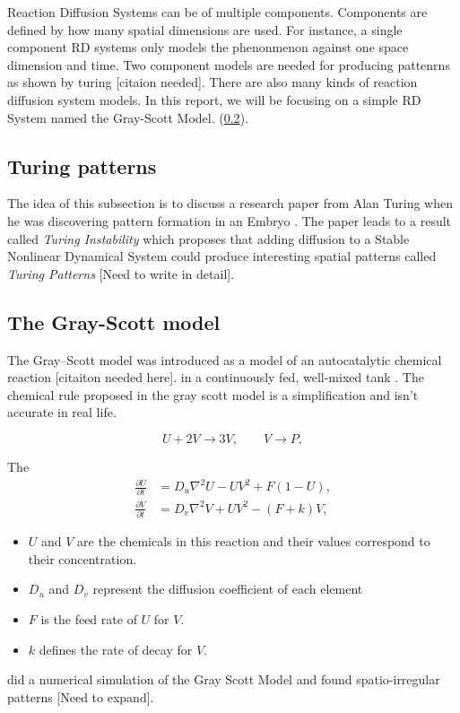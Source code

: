 Reaction Diffusion Systems can be of multiple components. Components are defined by how many spatial dimensions are used. For instance, a single component RD systems only models the phenonmenon against one space dimension and time. Two component models are needed for producing pattenrns as shown by turing [citaion needed]. There are also many kinds of reaction diffusion system models. In this report, we will be focusing on a simple RD System named the Gray-Scott Model. (\cref{sec:gray-scott}).

\subsection{Turing patterns}
\label{sec:turing-patterns}

The idea of this subsection is to discuss a research paper from Alan Turing when he was discovering pattern formation in an Embryo \cite{turing1952}. The paper leads to a result called \emph{Turing Instability} which proposes that adding diffusion to a Stable Nonlinear Dynamical System could produce interesting spatial patterns called \emph{Turing Patterns} [Need to write in detail].


\subsection{The Gray-Scott model}
\label{sec:gray-scott}
The Gray--Scott model was introduced as a model of an autocatalytic chemical reaction [citaiton needed here].
in a continuously fed, well-mixed tank \parencite{grayscott1984}. The chemical rule proposed in the gray scott model is a simplification and isn't accurate in real life.

\begin{equation}
	\label{eq:gs-reactions}
	U + 2V \to 3V, \qquad V \to P,
\end{equation}

The
\begin{equation}
	\label{eq:gray-scott}
	\begin{aligned}
		\frac{\partial U}{\partial t} & = D_u \nabla^2 U - UV^2 + F(1 - U), \\
		\frac{\partial V}{\partial t} & = D_v \nabla^2 V + UV^2 - (F + k)V,
	\end{aligned}
\end{equation}
\begin{itemize}
	\item $U$ and $V$ are the chemicals in this reaction and their values correspond to their concentration.
	\item $D_u$ and $D_v$ represent the diffusion coefficient of each element
	\item $F$ is the feed rate of $U$ for $V$.
	\item $k$ defines the rate of decay for $V$.
\end{itemize}



\cite{pearson1993} did a numerical simulation of the Gray Scott Model and found spatio-irregular patterns [Need to expand].
